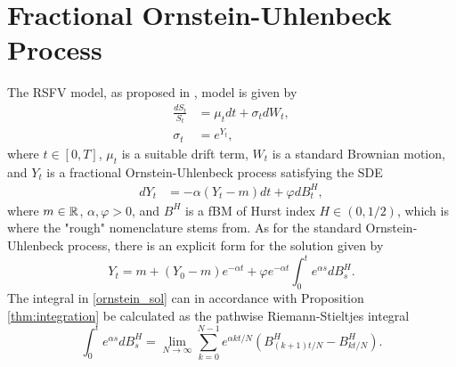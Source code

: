 \section{Fractional Ornstein-Uhlenbeck Process}
The RSFV model, as proposed in \cite{volisrough}, model is given by
\begin{align}
    \frac{dS_{t}}{S_{t}}&= \mu_{t}dt + \sigma_{t}dW_{t},\\
    \sigma_{t}&= e^{Y_{t}},
\end{align}
where $t\in [0,T]$, $\mu_{t}$ is a suitable drift term, $W_{t}$ is a standard Brownian motion, and $Y_{t}$ is a fractional Ornstein-Uhlenbeck process satisfying the SDE
\begin{align}
    dY_{t}&= -\alpha(Y_{t}-m)dt + \varphi dB^{H}_{t},
\end{align}
where $m \in \mathbb{R}$, $\alpha,\varphi >0$, and $B^{H}$ is a fBM of Hurst index $H\in(0,1/2)$, which is where the "rough" nomenclature stems from. As for the standard Ornstein-Uhlenbeck process, there is an explicit form for the solution given by
\begin{equation}\label{ornstein_sol}
    Y_{t}= m + (Y_{0}-m)e^{-\alpha t} + \varphi e^{-\alpha t}\int_{0}^{t}e^{\alpha s}dB_{s}^{H}.
\end{equation}
The integral in \eqref{ornstein_sol} can in accordance with Proposition \ref{thm:integration} be calculated as the pathwise Riemann-Stieltjes integral
\begin{equation}\label{eq:riemann}
    \int_{0}^{t}e^{\alpha s}dB_{s}^{H}=\lim_{N\to\infty}\sum_{k=0}^{N-1}e^{\alpha k t/N}\left(B_{(k+1)t/N}^{H}-B_{kt/N}^{H}\right).
\end{equation}
